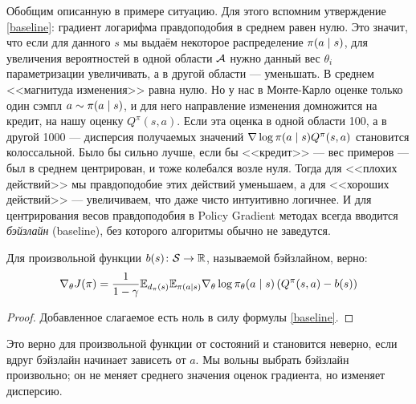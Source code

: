 Обобщим описанную в примере ситуацию. Для этого вспомним утверждение \eqref{baseline}: градиент логарифма правдоподобия в среднем равен нулю. Это значит, что если для данного $s$ мы выдаём некоторое распределение $\pi(a \HM\mid s)$, для увеличения вероятностей в одной области $\mathcal{A}$ нужно данный вес $\theta_i$ параметризации увеличивать, а в другой области --- уменьшать. В среднем <<магнитуда изменения>> равна нулю. Но у нас в Монте-Карло оценке только один сэмпл $a \sim \pi(a \HM\mid s)$, и для него направление изменения домножится на кредит, на нашу оценку $Q^{\pi}(s, a)$. Если эта оценка в одной области 100, а в другой 1000 --- дисперсия получаемых значений $\nabla \log \pi(a \HM\mid s) Q^{\pi}(s, a)$ становится колоссальной. Было бы сильно лучше, если бы <<кредит>> --- вес примеров --- был в среднем центрирован, и тоже колебался возле нуля. Тогда для <<плохих действий>> мы правдоподобие этих действий уменьшаем, а для <<хороших действий>> --- увеличиваем, что даже чисто интуитивно логичнее. И для центрирования весов правдоподобия в Policy Gradient методах всегда вводится \emph{бэйзлайн} (baseline), без которого алгоритмы обычно не заведутся.

\begin{proposition}
Для произвольной функции $b(s) \colon \mathcal{S} \to \mathbb{R}$, называемой бэйзлайном, верно:
\begin{equation}\label{pgt_baseline}
\nabla_{\theta} J(\pi) = \frac{1}{1 - \gamma}\mathbb{E}_{d_\pi(s)} \mathbb{E}_{\pi(a \mid s)} \nabla_{\theta} \log \pi_\theta (a \mid s) \left(Q^{\pi}(s, a) - b(s) \right)
\end{equation}
\begin{proof}
Добавленное слагаемое есть ноль в силу формулы \eqref{baseline}. 
\end{proof}
\end{proposition}

Это верно для произвольной функции от состояний и становится неверно, если вдруг бэйзлайн начинает зависеть от $a$. Мы вольны выбрать бэйзлайн произвольно; он не меняет среднего значения оценок градиента, но изменяет дисперсию. 

